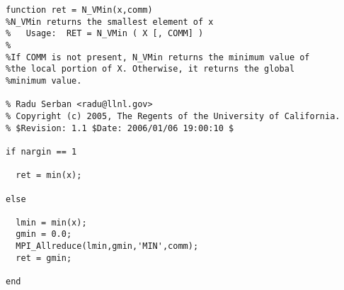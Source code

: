 \begin{lstlisting}[linerange={1-1,8-25}]
function ret = N_VMin(x,comm)
%N_VMin returns the smallest element of x
%   Usage:  RET = N_VMin ( X [, COMM] )
%
%If COMM is not present, N_VMin returns the minimum value of 
%the local portion of X. Otherwise, it returns the global
%minimum value.

% Radu Serban <radu@llnl.gov>
% Copyright (c) 2005, The Regents of the University of California.
% $Revision: 1.1 $Date: 2006/01/06 19:00:10 $

if nargin == 1
  
  ret = min(x);
  
else
  
  lmin = min(x);
  gmin = 0.0;
  MPI_Allreduce(lmin,gmin,'MIN',comm);
  ret = gmin;
  
end\end{lstlisting}
